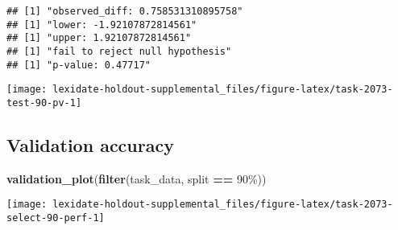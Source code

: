 \documentclass[
]{book}
\newenvironment{Shaded}{\begin{snugshade}}{\end{snugshade}}
\newcommand{\AttributeTok}[1]{\textcolor[rgb]{0.13,0.29,0.53}{#1}}
\newcommand{\DecValTok}[1]{\textcolor[rgb]{0.00,0.00,0.81}{#1}}
\newcommand{\FunctionTok}[1]{\textcolor[rgb]{0.13,0.29,0.53}{\textbf{#1}}}
\newcommand{\NormalTok}[1]{#1}
\newcommand{\OtherTok}[1]{\textcolor[rgb]{0.56,0.35,0.01}{#1}}
\newcommand{\SpecialCharTok}[1]{\textcolor[rgb]{0.81,0.36,0.00}{\textbf{#1}}}
\newcommand{\StringTok}[1]{\textcolor[rgb]{0.31,0.60,0.02}{#1}}
\begin{document}
\begin{Shaded}
\end{Shaded}

\begin{verbatim}
## [1] "observed_diff: 0.758531310895758"
## [1] "lower: -1.92107872814561"
## [1] "upper: 1.92107872814561"
## [1] "fail to reject null hypothesis"
## [1] "p-value: 0.47717"
\end{verbatim}

\texttt{[image: lexidate-holdout-supplemental\_files/figure-latex/task-2073-test-90-pv-1]}

\hypertarget{validation-accuracy-43}{%
\subsection{Validation accuracy}\label{validation-accuracy-43}}

\begin{Shaded}
\begin{Highlighting}[]
\FunctionTok{validation\_plot}\NormalTok{(}\FunctionTok{filter}\NormalTok{(task\_data, split }\SpecialCharTok{==} \StringTok{\textquotesingle{}90\%\textquotesingle{}}\NormalTok{))}
\end{Highlighting}
\end{Shaded}

\texttt{[image: lexidate-holdout-supplemental\_files/figure-latex/task-2073-select-90-perf-1]}
\end{document}
